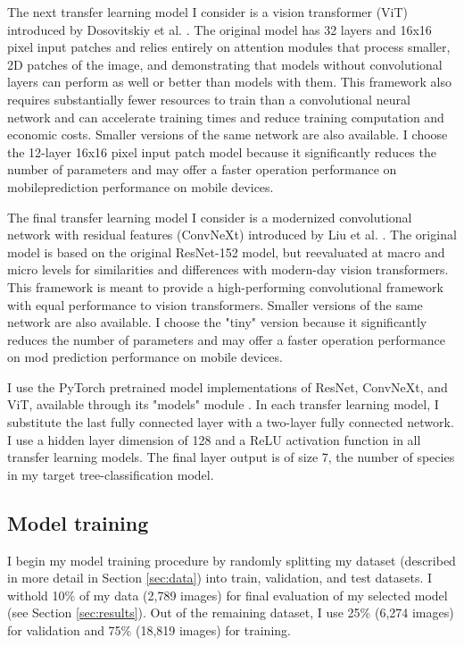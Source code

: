 \documentclass[10pt,twocolumn,letterpaper]{article}
\begin{document}
The next transfer learning model I consider is a vision transformer (ViT) introduced by Dosovitskiy et al. \cite{ViT}. The original model has 32 layers and 16x16 pixel input patches and relies entirely on attention modules that process smaller, 2D patches of the image, and demonstrating that models without convolutional layers can perform as well or better than models with them. This framework also requires substantially fewer resources to train than a convolutional neural network and can accelerate training times and reduce training computation and economic costs. Smaller versions of the same network are also available. I choose the 12-layer 16x16 pixel input patch model because it significantly reduces the number of parameters and may offer a faster operation performance on mobileprediction performance on mobile devices.

The final transfer learning model I consider is a modernized convolutional network with residual features (ConvNeXt) introduced by Liu et al. \cite{ConvNext}. The original model is based on the original ResNet-152 model, but reevaluated at macro and micro levels for similarities and differences with modern-day vision transformers. This framework is meant to provide a high-performing convolutional framework with equal performance to vision transformers. Smaller versions of the same network are also available. I choose the "tiny" version because it significantly reduces the number of parameters and may offer a faster operation performance on mod prediction performance on mobile devices.

I use the PyTorch pretrained model implementations of ResNet, ConvNeXt, and ViT, available through its "models" module \cite{PyTorch}. In each transfer learning model, I substitute the last fully connected layer with a two-layer fully connected network. I use a hidden layer dimension of 128 and a ReLU activation function in all transfer learning models. The final layer output is of size 7, the number of species in my target tree-classification model. 

\subsection{Model training}
\label{sec:model_sel}
I begin my model training procedure by randomly splitting my dataset (described in more detail in Section \ref{sec:data}) into train, validation, and test datasets. I withold 10\% of my data (2,789 images) for final evaluation of my selected model (see Section \ref{sec:results}). Out of the remaining dataset, I use 25\% (6,274 images) for validation and 75\% (18,819 images) for training.
\end{document}

